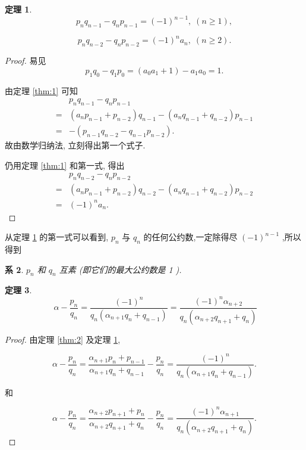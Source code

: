 \documentclass{ctexart}
\newtheorem{theorem}{\indent 定理}[section]
\newtheorem{corollary}[theorem]{\indent 系}
\begin{document}
\begin{theorem}
  \label{thm:3}
\[
{p}_{n}{q}_{n - 1} - {q}_{n}{p}_{n - 1} = {\left( -1\right) }^{n - 1},\;\left( {n \geq 1}\right) ,
\]

\[
{p}_{n}{q}_{n - 2} - {q}_{n}{p}_{n - 2} = {\left( -1\right) }^{n}{a}_{n},\;\left( {n \geq 2}\right) .
\]
\end{theorem}

\begin{proof}
  易见
\[
{p}_{1}{q}_{0} - {q}_{1}{p}_{0} = \left( {{a}_{0}{a}_{1} + 1}\right) - {a}_{1}{a}_{0} = 1.
\]

由定理 \ref{thm:1} 可知
\begin{align*}
  &{p}_{n}{q}_{n - 1} - {q}_{n}{p}_{n - 1}\\
  =& \left( {{a}_{n}{p}_{n - 1} + {p}_{n - 2}}\right) {q}_{n - 1} - \left( {{a}_{n}{q}_{n - 1} + {q}_{n - 2}}\right) {p}_{n - 1}\\
=& - \left( {{p}_{n - 1}{q}_{n - 2} - {q}_{n - 1}{p}_{n - 2}}\right) .
\end{align*}
故由数学归纳法, 立刻得出第一个式子.

仍用定理 \ref{thm:1} 和第一式, 得出
\begin{align*}
  &{p}_{n}{q}_{n - 2} - {q}_{n}{p}_{n - 2} \\
  = & \left( {{a}_{n}{p}_{n - 1} + {p}_{n - 2}}\right) {q}_{n - 2} - \left( {{a}_{n}{q}_{n - 1} + {q}_{n - 2}}\right) {p}_{n - 2}\\
  = & {\left( -1\right) }^{n}{a}_{n}\text{.}
\end{align*}
\end{proof}

从定理 \ref{thm:3} 的第一式可以看到, \({p}_n\) 与 \({q}_n\) 的任何公约数,一定除得尽 \({\left( -1\right) }^{n - 1}\) ,所以得到

\begin{corollary}
  \({p}_{n}\) 和 \({q}_{n}\) 互素 (即它们的最大公约数是 1 ).
\end{corollary}

\begin{theorem}
  \label{thm:4}
  \[\;\alpha - \frac{{p}_{n}}{{q}_{n}} = \frac{{\left( -1\right) }^{n}}{{q}_{n}\left( {{\alpha }_{n + 1}{q}_{n} + {q}_{n - 1}}\right) } = \frac{{\left( -1\right) }^{n}{\alpha }_{n + 2}}{{q}_{n}\left( {{\alpha }_{n + 2}{q}_{n + 1} + {q}_{n}}\right) }\]
\end{theorem}

\begin{proof}
  由定理 \ref{thm:2} 及定理 \ref{thm:3},

\[
\alpha - \frac{{p}_{n}}{{q}_{n}} = \frac{{\alpha }_{n + 1}{p}_{n} + {p}_{n - 1}}{{\alpha }_{n + 1}{q}_{n} + {q}_{n - 1}} - \frac{{p}_{n}}{{q}_{n}} = \frac{{\left( -1\right) }^{n}}{{q}_{n}\left( {{\alpha }_{n + 1}{q}_{n} + {q}_{n - 1}}\right) }.
\]

和

\[
\alpha - \frac{{p}_{n}}{{q}_{n}} = \frac{{\alpha }_{n + 2}{p}_{n + 1} + {p}_{n}}{{\alpha }_{n + 2}{q}_{n + 1} + {q}_{n}} - \frac{{p}_{n}}{{q}_{n}} = \frac{{\left( -1\right) }^{n}{\alpha }_{n + 1}}{{q}_{n}\left( {{\alpha }_{n + 2}{q}_{n + 1} + {q}_{n}}\right) }.
\]
\end{proof}
\end{document}
